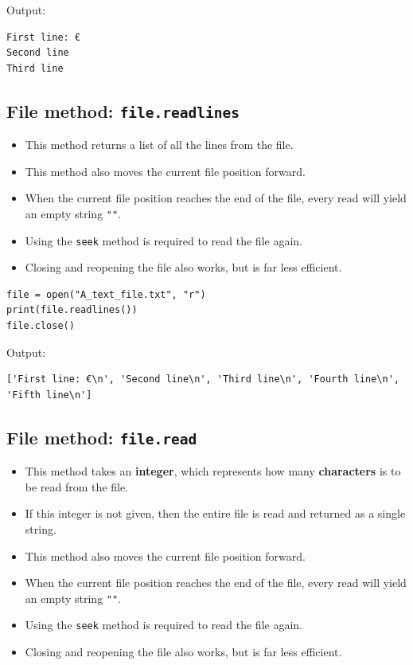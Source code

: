 \documentclass[11pt]{article}
\begin{document}
 \noindent Output:

\begin{verbatim}
First line: €
Second line
Third line
\end{verbatim}


 \newpage

\subsection{File method: \texttt{file.readlines}}
\label{sec:org6f2e704}
\begin{itemize}
\item This method returns a list of all the lines from the file.
\item This method also moves the current file position forward.
\item When the current file position reaches the end of the file, every read will yield an empty string \texttt{""}.
\item Using the \texttt{seek} method is required to read the file again.
\item Closing and reopening the file also works, but is far less efficient.
\end{itemize}

\begin{verbatim}
file = open("A_text_file.txt", "r")
print(file.readlines())
file.close()
\end{verbatim}

 \noindent Output:

\begin{verbatim}
['First line: €\n', 'Second line\n', 'Third line\n', 'Fourth line\n', 'Fifth line\n']
\end{verbatim}


 \newpage

\subsection{File method: \texttt{file.read}}
\label{sec:org86b339c}
\begin{itemize}
\item This method takes an \textbf{integer}, which represents how many \textbf{characters} is to be read from the file.
\item If this integer is not given, then the entire file is read and returned as a single string.
\item This method also moves the current file position forward.
\item When the current file position reaches the end of the file, every read will yield an empty string \texttt{""}.
\item Using the \texttt{seek} method is required to read the file again.
\item Closing and reopening the file also works, but is far less efficient.
\end{itemize}
\end{document}
